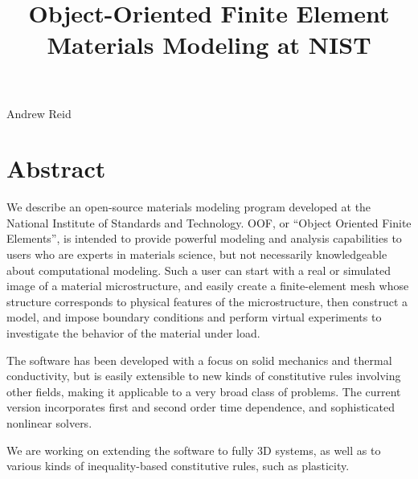 \title{Object-Oriented Finite Element Materials Modeling at NIST}
\author{} \institute{}
\maketitle

\begin{center}
{\large Andrew Reid}
\end{center}

\section*{Abstract}
We describe an open-source materials modeling program developed at the National Institute of Standards and Technology. OOF, or ``Object Oriented Finite Elements'', is intended to provide powerful modeling and analysis capabilities to users who are experts in materials science, but not necessarily knowledgeable about computational modeling.  Such a user can start with a real or simulated image of a material microstructure, and easily create a finite-element mesh whose structure corresponds to physical features of the microstructure, then construct a model, and impose boundary conditions and perform virtual experiments to investigate the behavior of the material under load.  

The software has been developed with a focus on solid mechanics and thermal conductivity, but is easily extensible to new kinds of constitutive rules involving other fields, making it applicable to a very broad class of problems.  The current version incorporates first and second order time dependence, and sophisticated nonlinear solvers.

We are working on extending the software to fully 3D systems, as well as to various kinds of inequality-based constitutive rules, such as plasticity.